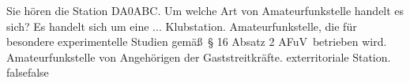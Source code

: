     {Sie hören die Station DA0ABC. Um welche Art von Amateurfunkstelle handelt es sich? Es handelt sich um eine ...}
    {Klubstation.}
    {Amateurfunkstelle, die für besondere experimentelle Studien gemäß § 16 Absatz 2 AFuV betrieben wird.}
    {Amateurfunkstelle von Angehörigen der Gaststreitkräfte.}
    {exterritoriale Station.}
    {false}{false}